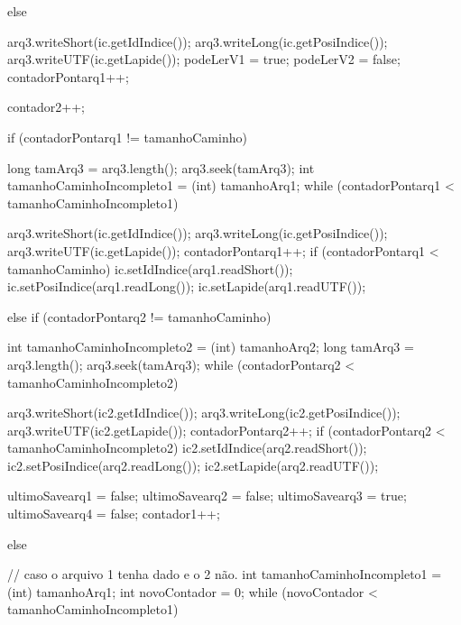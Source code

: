 {{{{{{{                  } else {
                    arq3.writeShort(ic.getIdIndice());
                    arq3.writeLong(ic.getPosiIndice());
                    arq3.writeUTF(ic.getLapide());
                    podeLerV1 = true;
                    podeLerV2 = false;
                    contadorPontarq1++;

                  }

                  contador2++;
                }

                if (contadorPontarq1 != tamanhoCaminho) {
                  long tamArq3 = arq3.length();
                  arq3.seek(tamArq3);
                  int tamanhoCaminhoIncompleto1 = (int) tamanhoArq1;
                  while (contadorPontarq1 < tamanhoCaminhoIncompleto1) {
                    arq3.writeShort(ic.getIdIndice());
                    arq3.writeLong(ic.getPosiIndice());
                    arq3.writeUTF(ic.getLapide());
                    contadorPontarq1++;
                    if (contadorPontarq1 < tamanhoCaminho) {
                      ic.setIdIndice(arq1.readShort());
                      ic.setPosiIndice(arq1.readLong());
                      ic.setLapide(arq1.readUTF());
                    }

                  }

                } else if (contadorPontarq2 != tamanhoCaminho) {
                  int tamanhoCaminhoIncompleto2 = (int) tamanhoArq2;
                  long tamArq3 = arq3.length();
                  arq3.seek(tamArq3);
                  while (contadorPontarq2 < tamanhoCaminhoIncompleto2) {
                    arq3.writeShort(ic2.getIdIndice());
                    arq3.writeLong(ic2.getPosiIndice());
                    arq3.writeUTF(ic2.getLapide());
                    contadorPontarq2++;
                    if (contadorPontarq2 < tamanhoCaminhoIncompleto2) {
                      ic2.setIdIndice(arq2.readShort());
                      ic2.setPosiIndice(arq2.readLong());
                      ic2.setLapide(arq2.readUTF());
                    }

                  }
                }
                ultimoSavearq1 = false;
                ultimoSavearq2 = false;
                ultimoSavearq3 = true;
                ultimoSavearq4 = false;
                contador1++;

              } else {// caso o arquivo 1 tenha dado e o 2 não.
                int tamanhoCaminhoIncompleto1 = (int) tamanhoArq1;
                int novoContador = 0;
                while (novoContador < tamanhoCaminhoIncompleto1) {

}}}}}}
